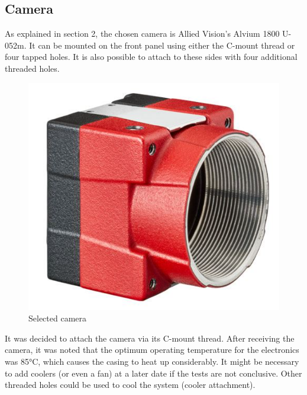\subsection{Camera}
As explained in section 2, the chosen camera is Allied Vision's Alvium 1800 U-052m. \newline
It can be mounted on the front panel using either the C-mount thread or four tapped 
holes. It is also possible to attach to these sides with four additional threaded holes.
\begin{figure}[H]
    \centering
    \includegraphics[scale=0.35]{assets/figures/Mechanical Design/Camera.png}
    \caption{Selected camera}
    \label{fig:Camera}
\end{figure}
It was decided to attach the camera via its C-mount thread. After receiving the camera, it was noted that the 
optimum operating temperature for the electronics was 85°C, which causes the casing to heat up considerably. 
It might be necessary to add coolers (or even a fan) at a later date if the tests are not conclusive. 
Other threaded holes could be used to cool the system (cooler attachment).
